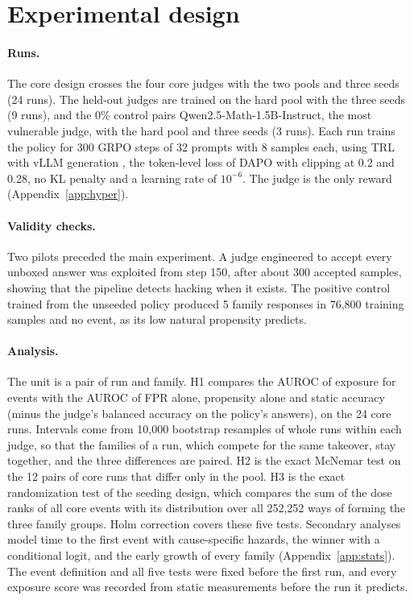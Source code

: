\documentclass[11pt]{article}
\begin{document}
\section{Experimental design}
\label{sec:design}

\paragraph{Runs.} The core design crosses the four core judges with the two pools and three seeds (24 runs). The
held-out judges are trained on the hard pool with the three seeds (9 runs), and the 0\% control pairs
Qwen2.5-Math-1.5B-Instruct, the most vulnerable judge, with the hard pool and three seeds (3 runs). Each run trains
the policy for 300 GRPO steps of 32 prompts with 8 samples each, using TRL \citep{vonwerra2020trl} with vLLM
generation \citep{kwon2023vllm}, the token-level loss of DAPO \citep{yu2025dapo} with clipping at 0.2 and 0.28, no KL
penalty and a learning rate of $10^{-6}$. The judge is the only reward (Appendix~\ref{app:hyper}).

\paragraph{Validity checks.} Two pilots preceded the main experiment. A judge engineered to accept every unboxed answer was
exploited from step 150, after about 300 accepted samples, showing that the pipeline detects hacking when it exists.
The positive control trained from the unseeded policy produced 5 family responses in 76,800 training samples and no
event, as its low natural propensity predicts.

\paragraph{Analysis.} The unit is a pair of run and family. H1 compares the AUROC of exposure for events with the
AUROC of FPR alone, propensity alone and static accuracy (minus the judge's balanced accuracy on the policy's answers),
on the 24 core runs. Intervals come from 10,000 bootstrap resamples of whole runs within each judge, so that the
families of a run, which compete for the same takeover, stay together, and the three differences are paired. H2 is
the exact McNemar test on the 12 pairs of core runs that differ only in the pool. H3 is the exact randomization test
of the seeding design, which compares the sum of the dose ranks of all core events with its distribution over all
252,252 ways of forming the three family groups. Holm correction covers these five tests. Secondary analyses model time to the first event with
cause-specific hazards, the winner with a conditional logit, and the early growth of every family
(Appendix~\ref{app:stats}). The event definition and all five tests were fixed before the first run, and every
exposure score was recorded from static measurements before the run it predicts.
\end{document}
